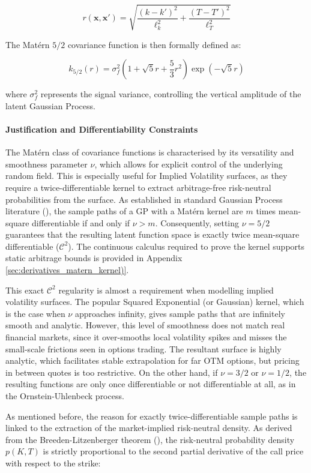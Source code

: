 \documentclass[12pt,oneside]{report}
\theoremstyle{definition}
\theoremstyle{remark}
\begin{document}
$$r(\mathbf{x}, \mathbf{x}') = \sqrt{\frac{(k - k')^2}{\ell_k^2} + \frac{(T - T')^2}{\ell_T^2}}$$

The Matérn $5/2$ covariance function is then formally defined as:

$$k_{5/2}(r) = \sigma_f^2 \left( 1 + \sqrt{5}r + \frac{5}{3}r^2 \right) \exp(-\sqrt{5}r)$$

where $\sigma_f^2$ represents the signal variance, controlling the vertical amplitude of the latent Gaussian Process.
\paragraph{Justification and Differentiability Constraints}

The Matérn class of covariance functions is characterised by its versatility and smoothness parameter $\nu$, which allows for explicit control of the underlying random field. This is especially useful for Implied Volatility surfaces, as they require a twice-differentiable kernel to extract arbitrage-free risk-neutral probabilities from the surface. As established in standard Gaussian Process literature (\citet{rasmussen2006gp}), the sample paths of a GP with a Matérn kernel are $m$ times mean-square differentiable if and only if $\nu > m$. Consequently, setting $\nu = 5/2$ guarantees that the resulting latent function space is exactly twice mean-square differentiable ($\mathcal{C}^2$). The continuous calculus required to prove the kernel supports static arbitrage bounds is provided in Appendix \ref{sec:derivatives_matern_kernel)}. 

This exact $\mathcal{C}^2$ regularity is almost a requirement when modelling implied volatility surfaces. The popular Squared Exponential (or Gaussian) kernel, which is the case when $\nu$ approaches infinity, gives sample paths that are infinitely smooth and analytic. However, this level of smoothness does not match real financial markets, since it over-smooths local volatility spikes and misses the small-scale frictions seen in options trading. The resultant surface is highly analytic, which facilitates stable extrapolation for far OTM options, but pricing in between quotes is too restrictive. On the other hand, if $\nu = 3/2$ or $\nu = 1/2$, the resulting functions are only once differentiable or not differentiable at all, as in the Ornstein-Uhlenbeck process.

As mentioned before, the reason for exactly twice-differentiable sample paths is linked to the extraction of the market-implied risk-neutral density. As derived from the Breeden-Litzenberger theorem (\citet{breeden1978prices}), the risk-neutral probability density $p(K,T)$ is strictly proportional to the second partial derivative of the call price with respect to the strike:
\end{document}
